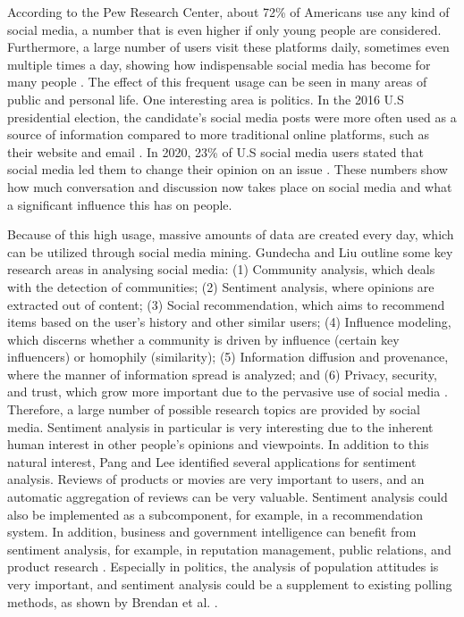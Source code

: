 According to the Pew Research Center, about 72\% of Americans use any kind of social media, a number that is even higher if only young people are considered. Furthermore, a large number of users visit these platforms daily, sometimes even multiple times a day, showing how indispensable social media has become for many people \cite{pew:socialmedia}. The effect of this frequent usage can be seen in many areas of public and personal life. One interesting area is politics. In the 2016 U.S presidential election, the candidate's social media posts were more often used as a source of information compared to more traditional online platforms, such as their website and email \cite{pew:2016source}. In 2020, 23\% of U.S social media users stated that social media led them to change their opinion on an issue \cite{pew:2020influence}. These numbers show how much conversation and discussion now takes place on social media and what a significant influence this has on people.

Because of this high usage, massive amounts of data are created every day, which can be utilized through social media mining. Gundecha and Liu outline some key research areas in analysing social media: (1) Community analysis, which deals with the detection of communities; (2) Sentiment analysis, where opinions are extracted out of content; (3) Social recommendation, which aims to recommend items based on the user's history and other similar users; (4) Influence modeling, which discerns whether a community is driven by influence (certain key influencers) or homophily (similarity); (5) Information diffusion and provenance, where the manner of information spread is analyzed; and (6) Privacy, security, and trust, which grow more important due to the pervasive use of social media \cite{Gundecha2012MiningSM}.
Therefore, a large number of possible research topics are provided by social media. Sentiment analysis in particular is very interesting due to the inherent human interest in other people's opinions and viewpoints. In addition to this natural interest, Pang and Lee identified several applications for sentiment analysis. Reviews of products or movies are very important to users, and an automatic aggregation of reviews can be very valuable. Sentiment analysis could also be implemented as a subcomponent, for example, in a recommendation system. In addition, business and government intelligence can benefit from sentiment analysis, for example, in reputation management, public relations, and product research \cite{pang-etal-2002-thumbs}. Especially in politics, the analysis of population attitudes is very important, and sentiment analysis could be a supplement to existing polling methods, as shown by Brendan et al. \cite{polls}. 

